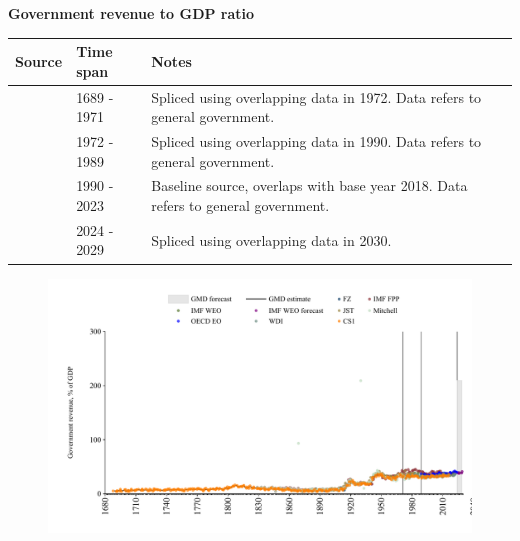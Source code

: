 \documentclass[12pt,a4paper,landscape]{article}
\begin{document}
\begin{adjustbox}{max totalsize={\paperwidth}{\paperheight},center}
\begin{minipage}[t][\textheight][t]{\textwidth}
\vspace*{0.5cm}
{}
\begin{center}
{\Large\bfseries Government revenue to GDP ratio}
\end{center}
\vspace{0.5cm}
\begin{table}[H]
\centering
\small
\begin{tabular}{|l|l|l|}
\hline
\textbf{Source} & \textbf{Time span} & \textbf{Notes} \\
\hline
\rowcolor{white}\cite{CS1_GBR}& 1689 - 1971 &Spliced using overlapping data in 1972. Data refers to general government.\\
\rowcolor{lightgray}\cite{WDI}& 1972 - 1989 &Spliced using overlapping data in 1990. Data refers to general government.\\
\rowcolor{white}\cite{OECD_EO}& 1990 - 2023 &Baseline source, overlaps with base year 2018. Data refers to general government.\\
\rowcolor{lightgray}\cite{IMF_WEO_forecast}& 2024 - 2029 &Spliced using overlapping data in 2030. \\
\hline
\end{tabular}
\end{table}
\begin{figure}[H]
\centering
\includegraphics[width=\textwidth,height=0.6\textheight,keepaspectratio]{graphs/GBR_govrev_GDP.pdf}
\end{figure}
\end{minipage}
\end{adjustbox}
\end{document}
